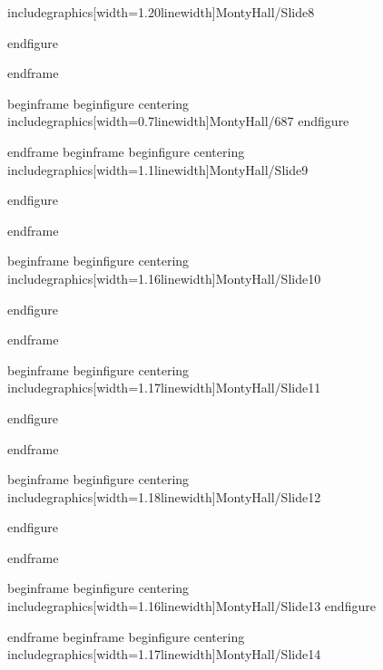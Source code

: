 		includegraphics[width=1.20linewidth]{MontyHall/Slide8}
		
	end{figure}
	
end{frame}

begin{frame}
	begin{figure}
		centering
		includegraphics[width=0.7linewidth]{MontyHall/687}
	end{figure}
	
end{frame}
begin{frame}
	begin{figure}
		centering
		includegraphics[width=1.1linewidth]{MontyHall/Slide9}

	end{figure}
	
end{frame}


begin{frame}
	begin{figure}
		centering
		includegraphics[width=1.16linewidth]{MontyHall/Slide10}
		
	end{figure}
	
end{frame}

begin{frame}
	begin{figure}
		centering
		includegraphics[width=1.17linewidth]{MontyHall/Slide11}
		
	end{figure}
	
end{frame}

begin{frame}
	begin{figure}
		centering
		includegraphics[width=1.18linewidth]{MontyHall/Slide12}

	end{figure}
	
end{frame}

begin{frame}
	begin{figure}
		centering
		includegraphics[width=1.16linewidth]{MontyHall/Slide13}
	end{figure}
	
end{frame}
begin{frame}
	begin{figure}
		centering
		includegraphics[width=1.17linewidth]{MontyHall/Slide14}

